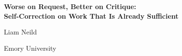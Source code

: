 \documentclass[12pt]{article}
\begin{document}
\begin{center}
  {\LARGE\bfseries Worse on Request, Better on Critique:\\[0.25em]
   Self-Correction on Work That Is Already Sufficient\par}
  \vspace{1.1em}
  {\large Liam Neild\par}
  \vspace{0.3em}
  {\normalsize Emory University\par}
\end{center}

\vspace{2.2em}



\vfill


\end{document}
